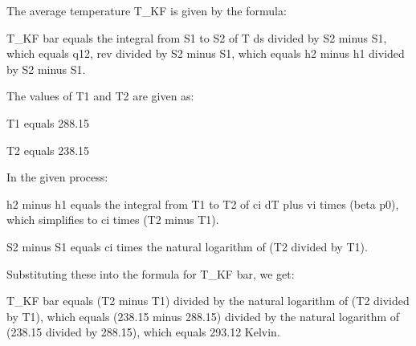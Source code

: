 The average temperature T_KF is given by the formula:

T_KF bar equals the integral from S1 to S2 of T ds divided by S2 minus S1, which equals q12, rev divided by S2 minus S1, which equals h2 minus h1 divided by S2 minus S1.

The values of T1 and T2 are given as:

T1 equals 288.15

T2 equals 238.15

In the given process:

h2 minus h1 equals the integral from T1 to T2 of ci dT plus vi times (beta p0), which simplifies to ci times (T2 minus T1).

S2 minus S1 equals ci times the natural logarithm of (T2 divided by T1).

Substituting these into the formula for T_KF bar, we get:

T_KF bar equals (T2 minus T1) divided by the natural logarithm of (T2 divided by T1), which equals (238.15 minus 288.15) divided by the natural logarithm of (238.15 divided by 288.15), which equals 293.12 Kelvin.